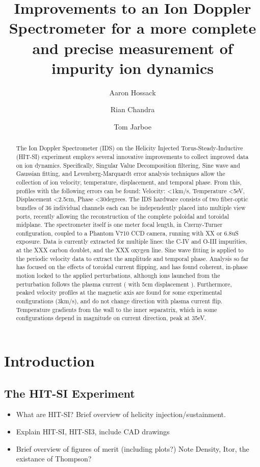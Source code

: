 \documentclass[10pt]{article}
\title{\vspace{-15mm}\fontsize{24pt}{10pt}
\selectfont\textbf{Improvements to an Ion Doppler Spectrometer for a more complete and precise measurement of impurity ion dynamics}}
\author[1]{Aaron Hossack}
\author[1]{Rian Chandra}
\author[1]{Tom Jarboe}
\affil[1]{University of Washington, Seattle, WA, USA}
\begin{document}
\maketitle
\begin{abstract}
	The Ion Doppler Spectrometer (IDS) on the Helicity Injected Torus-Steady-Inductive (HIT-SI) experiment employs several innovative improvements to collect improved data on ion dynamics. Specifically, Singular Value Decomposition filtering, Sine wave and Gaussian fitting, and Levenberg-Marquardt error analysis techniques allow the collection of ion velocity, temperature, displacement, and temporal phase. From this, profiles with the following errors can be found: Velocity: <1km/s, Temperature <5eV, Displacement <2.5cm, Phase <30degrees. The IDS hardware consists of two fiber-optic bundles of 36 individual channels each can be independently placed into multiple view ports, recently allowing the reconstruction of the complete poloidal and toroidal midplane. The spectrometer itself is one meter focal length, in Czerny-Turner configuration, coupled to a Phantom V710 CCD camera, running with XX or 6.8uS exposure. Data is currently extracted for multiple lines: the C-IV and O-III impurities, at the XXX carbon doublet, and the XXX oxygen line. Sine wave fitting is applied to the periodic velocity data to extract the amplitude and temporal phase. Analysis so far has focused on the effects of toroidal current flipping, and has found coherent, in-phase motion locked to the applied perturbations, although ions launched from the perturbation follows the plasma current ( with 5cm displacement ). Furthermore, peaked velocity profiles at the magnetic axis are found for some experimental configurations (3km/s), and do not change direction with plasma current flip. Temperature gradients from the wall to the inner separatrix, which in some configurations depend in magnitude on current direction, peak at 35eV.
\end{abstract}
\section{Introduction}
\subsection{The HIT-SI Experiment}
\begin{itemize}
	\item What are HIT-SI? Brief overview of helicity injection/sustainment.
	\item Explain HIT-SI, HIT-SI3, include CAD drawings
	\item Brief overview of figures of merit (including plots?) Note Density, Itor, the existance of Thompson?
\end{itemize}
\end{document}
